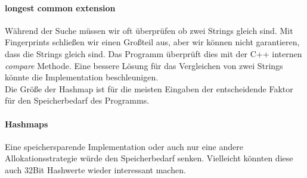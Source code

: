 \paragraph{longest common extension}
Während der Suche müssen wir oft überprüfen ob zwei Strings gleich sind. Mit Fingerprints schließen wir einen Großteil aus, aber wir können nicht garantieren, dass die Strings gleich sind. Das Programm überprüft dies mit der C++ internen \emph{compare} Methode. Eine bessere Lösung für das Vergleichen von zwei Strings könnte die Implementation beschleunigen.\\
Die Größe der Hashmap ist für die meisten Eingaben der entscheidende Faktor
für den Speicherbedarf des Programms.
\paragraph{Hashmaps}
Eine speichersparende Implementation oder auch nur eine andere
Allokationsstrategie würde den Speicherbedarf senken. Vielleicht könnten
diese auch 32Bit Hash\-werte wieder interessant machen.\\






